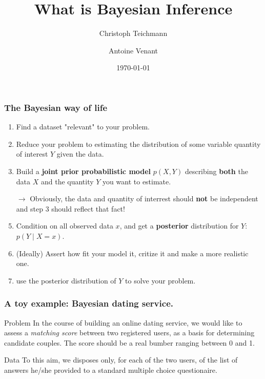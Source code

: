 \documentclass{beamer}
\begin{document}
\title{What is Bayesian Inference} 
\author[Antoine Venant]{Christoph Teichmann \and Antoine Venant}
\date{\today}
\maketitle


\begin{frame}
  \frametitle{The Bayesian way of life}

    \begin{enumerate}
    \item Find a dataset "relevant" to your problem.
    \item Reduce your problem to estimating the distribution of some variable quantity of interest $Y$ given the data.
    \item Build a {\bf joint prior probabilistic model} $p(X,Y)$ describing {\bf both} the data $X$ and the quantity $Y$ you want to estimate.
    \item[\alert{$\rightarrow$}]\alert{Obviously, the data and quantity of interrest should {\bf not} be independent and step 3 should reflect that fact!}
    \item Condition on all observed data $x$, and get a \textbf{posterior} distribution for $Y$: $p(Y \mid X=x)$.
    \item (Ideally) Assert how fit your model it, critize it and make a more realistic one.
    \item use the posterior distribution of $Y$ to solve your problem.
    \end{enumerate}
\end{frame}

\begin{frame}
  \frametitle{A toy example: Bayesian dating service.}
  \begin{exampleblock}{Problem}
    In the course of building an online dating service, we would like to assess a \emph{matching score} between two registered users, as a basis for determining candidate couples. The score should be a real bumber ranging between 0 and 1.
  \end{exampleblock}
  \begin{exampleblock}{Data}
    To this aim, we disposes only, for each of the two users, of the list of answers he/she provided to a standard multiple choice questionaire.
  \end{exampleblock}
\end{frame}
\end{document}
